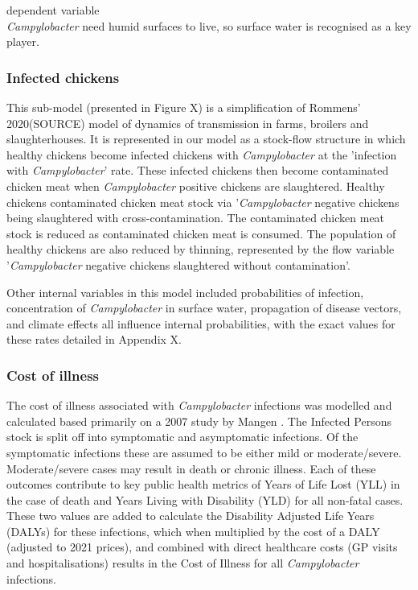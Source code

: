 

\textcolor{AMAZINGPINK}{dependent variable} \\
\textit{Campylobacter} need humid surfaces to live, so surface water is recognised as a key player. %

\subsubsection*{Infected chickens}
This sub-model (presented in Figure X) is a simplification of Rommens' 2020(SOURCE) model of dynamics of transmission in farms, broilers and slaughterhouses. It is represented in our model as a stock-flow structure in which healthy chickens become infected chickens with \textit{Campylobacter} at the 'infection with \textit{Campylobacter}' rate. These infected chickens then become contaminated chicken meat when \textit{Campylobacter} positive chickens are slaughtered. Healthy chickens  contaminated chicken meat stock via '\textit{Campylobacter} negative chickens being slaughtered with cross-contamination. The contaminated chicken meat stock is reduced as contaminated chicken meat is consumed. The population of healthy chickens are also reduced by thinning, represented by the flow variable '\textit{Campylobacter} negative chickens slaughtered without contamination'.

Other internal variables in this model included probabilities of infection, concentration of \textit{Campylobacter} in surface water, propagation of disease vectors, and climate effects all influence internal probabilities, with the exact values for these rates detailed in Appendix X.


\subsubsection*{Cost of illness}

The cost of illness associated with \textit{Campylobacter} infections was modelled and calculated based primarily on a 2007 study by Mangen \parencite{mangen_campylobacteriosis_nodate}. The Infected Persons stock is split off into symptomatic and asymptomatic infections. Of the symptomatic infections these are assumed to be either mild or moderate/severe. Moderate/severe cases may result in death or chronic illness. Each of these outcomes contribute to key public health metrics of Years of Life Lost (YLL) in the case of death and Years Living with Disability (YLD) for all non-fatal cases. These two values are added to calculate the Disability Adjusted Life Years (DALYs) for these infections, which when multiplied by the cost of a DALY (adjusted to 2021 prices), and combined with direct healthcare costs (GP visits and hospitalisations) results in the Cost of Illness for all \textit{Campylobacter} infections.

